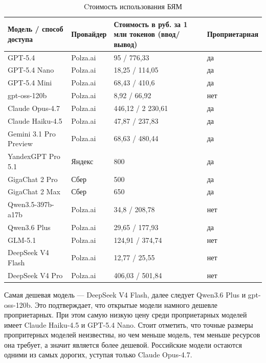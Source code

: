 \begin{table}[h!]
\LeftCaption
\caption{Cтоимость использования БЯМ}
\label{tab:llm_costs}
\centering
\begin{tabular}{|p{4.6cm}|p{3.0cm}|p{4.3cm}|p{2.6cm}|}
\hline
\textbf{Модель / способ доступа} & \textbf{Провайдер} &\textbf{Стоимость в руб. за 1\,млн токенов (ввод/вывод)} & \textbf{Пропри\-етарная} \\
\hline
GPT-5.4             & Polza.ai & 95 / 776,33 & да \\
\hline
GPT-5.4 Nano        & Polza.ai &  18,25  / 114,05 & да \\
\hline
GPT-5.4 Mini        & Polza.ai &  68,43 / 410,6 & да \\
\hline
gpt-oss-120b        & Polza.ai &  8,92 / 66,92 & нет \\
\hline
Claude Opus-4.7     & Polza.ai & 446,12 / 2 230,61 & да \\
\hline
Claude Haiku-4.5    & Polza.ai & 47,87 / 237,83 & да \\
\hline
Gemini 3.1 Pro Preview      & Polza.ai & 68,63 / 480,44 & да \\
\hline
YandexGPT Pro 5.1   & Яндекс & 800 & да \\
\hline
GigaChat 2 Pro      & Сбер   & 500 & да \\
\hline
GigaChat 2 Max      & Сбер   & 650 & да \\
\hline
Qwen3.5-397b-a17b   & Polza.ai & 34,8 / 208,78 & нет \\
\hline
Qwen3.6 Plus        & Polza.ai & 29,65 / 177,93 & да \\
\hline
GLM-5.1             & Polza.ai & 124,91 / 374,74 & нет \\
\hline
DeepSeek V4 Flash   & Polza.ai & 12,77 / 25,55 & нет \\
\hline
DeepSeek V4 Pro     & Polza.ai & 406,03 / 501,84 & нет \\
\hline
\end{tabular}
\end{table}

Самая дешевая модель --- DeepSeek V4 Flash, далее следует Qwen3.6 Plus и gpt-oss-120b. Это подтверждает, что открытые модели намного дешевле проприетарных. При этом самую низкую цену среди проприетарных моделей имеет Claude Haiku-4.5 и GPT-5.4 Nano. Стоит отметить, что точные размеры пропритерных моделей неизвестны, но чем меньше модель, тем меньше ресурсов она требует, а значит является более дешевой. Российские модели остаются одними из самых дорогих, уступая только Claude Opus-4.7.


